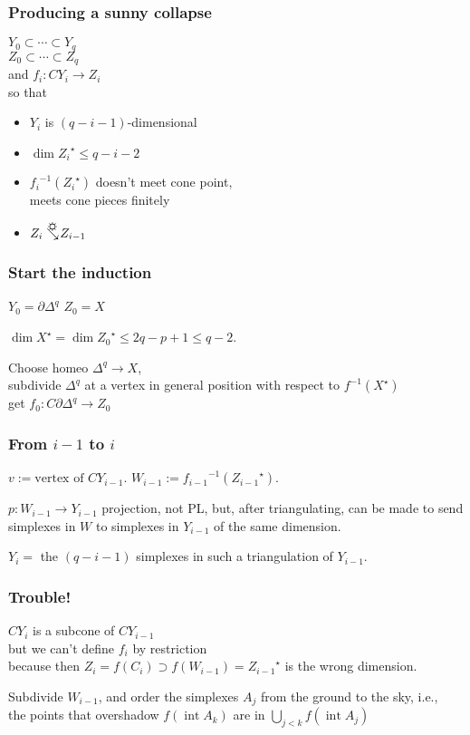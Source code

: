\documentclass[14pt]{beamer}
\newcommand{\sunnycollapses}{\searrow\hspace{-12pt}\mbox{\raisebox{5pt}{\sun}}\hspace{2pt}}
\DeclareMathOperator{\interior}{int}
\begin{document}
\begin{frame}
  \frametitle{Producing a sunny collapse}

  $Y_0 \subset \cdots \subset Y_q$ \\
  $Z_0 \subset \cdots \subset Z_q$ \\
  and $f_i : CY_i \to Z_i$ \\
  so that
  \begin{itemize}
  \item $Y_i$ is $(q-i-1)$-dimensional 
  \item $\dim {Z_i}^\star \leq q-i-2$ \\
  \item ${f_i}^{-1}({Z_i}^\star)$ doesn't meet cone point, \\
    \quad meets cone pieces finitely
  \item ${Z_i} \sunnycollapses {Z_{i-1}}$
  \end{itemize}

\end{frame}

\begin{frame}
  \frametitle{Start the induction}
  
  $Y_0 = \partial \Delta^q$ \hfill $Z_0 = X$

  \vfill

  $\dim X^\star = \dim {Z_0}^\star \leq 2q - p + 1 \leq q-2$.

  \vfill

  Choose homeo $\Delta^q \to X$, \\
  subdivide $\Delta^q$ at a vertex in general position with respect to
  $f^{-1}(X^\star)$ \\
  get $f_0 : C\partial \Delta^q \to Z_0$
\end{frame}

\begin{frame}
  \frametitle{From $i-1$ to $i$}

  $v := \mbox{vertex of $CY_{i-1}$}$.
  $W_{i-1} := {f_{i-1}}^{-1}({Z_{i-1}}^\star)$.

  $p : W_{i-1} \to Y_{i-1}$ projection, not PL, but, after triangulating,
  can be made to send simplexes in $W$ to simplexes in $Y_{i-1}$ of
  the same dimension.

  $Y_i = $ the $(q-i-1)$ simplexes in such a triangulation of $Y_{i-1}$.
\end{frame}

\begin{frame}
  \frametitle{Trouble!}
  
  $CY_i$ is a subcone of $CY_{i-1}$ \\
  but we can't define $f_i$ by restriction \\
  because then $Z_i = f(C_i) \supset f(W_{i-1}) = {Z_{i-1}}^\star$ is the
  wrong dimension.

  \vfill

  Subdivide $W_{i-1}$, and order the simplexes $A_j$ from the ground to the
  sky, i.e., \\
  the points that overshadow $f(\interior A_k)$ are in $\bigcup_{j <
    k} f(\interior A_j)$
\end{frame}
\end{document}
